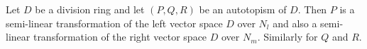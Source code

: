 Let $D$ be a division ring and let $(P, Q, R)$ be an autotopism of $D$. Then $P$ is a semi-linear transformation of the left vector space $D$ over $N_l$ and also a semi-linear transformation of the right vector space $D$ over $N_m$. Similarly for $Q$ and $R$.
